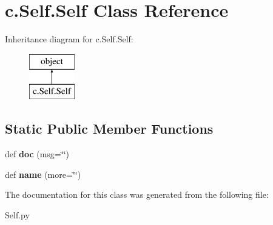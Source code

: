 \hypertarget{classc_1_1_self_1_1_self}{}\section{c.\+Self.\+Self Class Reference}
\label{classc_1_1_self_1_1_self}
Inheritance diagram for c.\+Self.\+Self\+:\begin{figure}[H]
\begin{center}
\leavevmode
\includegraphics[height=2.000000cm]{classc_1_1_self_1_1_self}
\end{center}
\end{figure}
\subsection*{Static Public Member Functions}
\begin{DoxyCompactItemize}
\item 
def {\bfseries doc} (msg=\char`\"{}\char`\"{})\hypertarget{classc_1_1_self_1_1_self_a22c63e1abd3787d91e274dba52eefeb5}{}\label{classc_1_1_self_1_1_self_a22c63e1abd3787d91e274dba52eefeb5}

\item 
def {\bfseries name} (more=\char`\"{}\char`\"{})\hypertarget{classc_1_1_self_1_1_self_ac085532aafa2c634b302e7de5c0b67a7}{}\label{classc_1_1_self_1_1_self_ac085532aafa2c634b302e7de5c0b67a7}

\end{DoxyCompactItemize}


The documentation for this class was generated from the following file\+:\begin{DoxyCompactItemize}
\item 
Self.\+py\end{DoxyCompactItemize}
